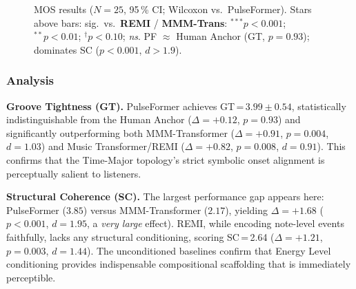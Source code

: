 \documentclass[conference]{IEEEtran}
\begin{document}
\begin{figure}[ht]
\begin{minipage}{\columnwidth}
\end{minipage}

{\sloppy{}\caption{MOS results ($N=25$, 95\,\% CI;
  Wilcoxon vs.\ PulseFormer).
  Stars above bars: sig.\ vs.\ {\color{cMGen}\textbf{REMI}} /
  {\color{cTM}\textbf{MMM-Trans}}:
  $^{***}p{<}0.001$; $^{**}p{<}0.01$; $^{\dagger}p{<}0.10$; \textit{ns}.
  PF $\approx$ Human Anchor (GT, $p=0.93$); dominates SC ($p{<}0.001$, $d{>}1.9$).}}
\label{fig:mos}
\end{figure}

\subsubsection*{Analysis}

\textbf{Groove Tightness (GT).} PulseFormer achieves GT\,=\,$3.99\!\pm\!0.54$, statistically indistinguishable from the Human Anchor ($\Delta=+0.12$, $p=0.93$) and significantly outperforming both MMM-Transformer ($\Delta=+0.91$, $p=0.004$, $d=1.03$) and Music Transformer/REMI ($\Delta=+0.82$, $p=0.008$, $d=0.91$). This confirms that the Time-Major topology's strict symbolic onset alignment is perceptually salient to listeners.

\textbf{Structural Coherence (SC).} The largest performance gap appears here: PulseFormer ($3.85$) versus MMM-Transformer ($2.17$), yielding $\Delta=+1.68$ ($p<0.001$, $d=1.95$, a \textit{very large} effect). REMI, while encoding note-level events faithfully, lacks any structural conditioning, scoring SC\,=\,2.64 ($\Delta=+1.21$, $p=0.003$, $d=1.44$). The unconditioned baselines confirm that Energy Level conditioning provides indispensable compositional scaffolding that is immediately perceptible.
\end{document}
